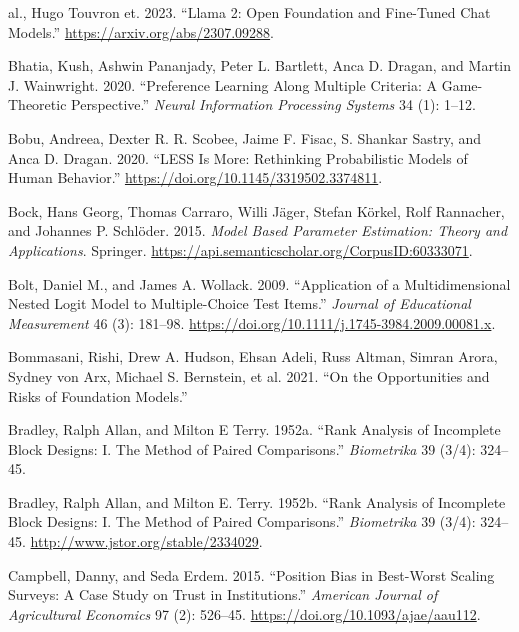 \documentclass[
  letterpaper,
  DIV=11,
  numbers=noendperiod,
  oneside]{scrreprt}
\newlength{\cslhangindent}
\newenvironment{CSLReferences}[2] %
 {\begin{list}{}{%
  \setlength{\itemindent}{0pt}
  \setlength{\leftmargin}{0pt}
  \setlength{\parsep}{0pt}
  \ifodd #1
   \setlength{\leftmargin}{\cslhangindent}
   \setlength{\itemindent}{-1\cslhangindent}
  \fi
  \setlength{\itemsep}{#2\baselineskip}}}
 {\end{list}}
\theoremstyle{remark}
\begin{document}
\label{refs-2}
\begin{CSLReferences}{1}{0}
al., Hugo Touvron et. 2023. {``Llama 2: Open Foundation and Fine-Tuned
Chat Models.''} \url{https://arxiv.org/abs/2307.09288}.

Bhatia, Kush, Ashwin Pananjady, Peter L. Bartlett, Anca D. Dragan, and
Martin J. Wainwright. 2020. {``Preference Learning Along Multiple
Criteria: A Game-Theoretic Perspective.''} \emph{Neural Information
Processing Systems} 34 (1): 1--12.

Bobu, Andreea, Dexter R. R. Scobee, Jaime F. Fisac, S. Shankar Sastry,
and Anca D. Dragan. 2020. {``LESS Is More: Rethinking Probabilistic
Models of Human Behavior.''}
\url{https://doi.org/10.1145/3319502.3374811}.

Bock, Hans Georg, Thomas Carraro, Willi Jäger, Stefan Körkel, Rolf
Rannacher, and Johannes P. Schlöder. 2015. \emph{Model Based Parameter
Estimation: Theory and Applications}. Springer.
\url{https://api.semanticscholar.org/CorpusID:60333071}.

Bolt, Daniel M., and James A. Wollack. 2009. {``Application of a
Multidimensional Nested Logit Model to Multiple-Choice Test Items.''}
\emph{Journal of Educational Measurement} 46 (3): 181--98.
\url{https://doi.org/10.1111/j.1745-3984.2009.00081.x}.

Bommasani, Rishi, Drew A. Hudson, Ehsan Adeli, Russ Altman, Simran
Arora, Sydney von Arx, Michael S. Bernstein, et al. 2021. {``On the
Opportunities and Risks of Foundation Models.''}

Bradley, Ralph Allan, and Milton E Terry. 1952a. {``Rank Analysis of
Incomplete Block Designs: I. The Method of Paired Comparisons.''}
\emph{Biometrika} 39 (3/4): 324--45.

Bradley, Ralph Allan, and Milton E. Terry. 1952b. {``Rank Analysis of
Incomplete Block Designs: I. The Method of Paired Comparisons.''}
\emph{Biometrika} 39 (3/4): 324--45.
\url{http://www.jstor.org/stable/2334029}.

Campbell, Danny, and Seda Erdem. 2015. {``Position Bias in Best-Worst
Scaling Surveys: A Case Study on Trust in Institutions.''}
\emph{American Journal of Agricultural Economics} 97 (2): 526--45.
\url{https://doi.org/10.1093/ajae/aau112}.


\end{CSLReferences}
\end{document}

